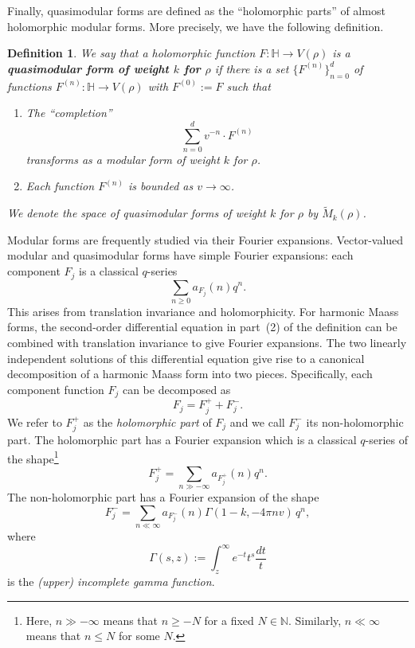 \documentclass[11pt,reqno]{amsart}
\newtheorem{definition}[theorem]{Definition}
\renewcommand{\=}{\;=\;}
\theoremstyle{myremark}
\begin{document}
Finally, quasimodular forms are defined as the ``holomorphic parts'' of almost holomorphic modular forms. 
More precisely, we have the following definition.
\begin{definition}
We say that a holomorphic function $F\colon\mathbb H\rightarrow V(\rho)$ is a {\bf quasimodular form of weight $k$ for $\rho$} if there is a set $\{F^{(n)}\}_{n=0}^d$ of functions $F^{(n)}\colon\mathbb H\rightarrow V(\rho)$ with $F^{(0)}:=F$ such that
\begin{enumerate}
\renewcommand{\labelenumi}{\textup{(\arabic{enumi})}}
    \item The ``completion'' 
        \[
        \sum_{n=0}^d v^{-n}\cdot F^{(n)}
        \]        
    transforms as a modular form of weight $k$ for $\rho$.
    \item  Each function $F^{(n)}$ is bounded as $v\rightarrow\infty$.
    \end{enumerate} 
We denote the space of quasimodular forms of weight $k$ for $\rho$ by $\widetilde M_k(\rho)$.
\end{definition}

Modular forms are frequently studied via their Fourier expansions. Vector-valued modular and quasimodular forms have simple Fourier expansions: each component $F_j$ is a classical $q$-series 
\[
\sum_{n\geq0}a_{F_j}(n)q^n.
\]
This arises from translation invariance and holomorphicity. 
For harmonic Maass forms, the second-order differential equation in part~(2) of the definition can be combined with translation invariance to give Fourier expansions.  
The two linearly independent solutions of this differential equation give rise to a canonical decomposition of a harmonic Maass form into two pieces.
Specifically, each component function $F_j$ can be decomposed as 
\[
F_j=F_j^+ + F_j^-.
\]
We refer to $F_j^+$ as the {\it holomorphic part} of $F_j$ and we call $F_j^-$ its non-holomorphic part. 
The holomorphic part has a Fourier expansion which is a classical $q$-series of the shape\footnote{Here, $n\gg-\infty$ means that $n\geq -N$ for a fixed $N\in\mathbb N$. 
Similarly, $n\ll\infty$ means that $n\leq N$ for some $N$.}
\[
F_j^+=\sum_{n\gg -\infty} a_{F_j^+}(n)q^n.
\]
The non-holomorphic part has a Fourier expansion of the shape
\[
F_j^-=\sum_{n\ll \infty} a_{F_j^-}(n)\Gamma(1-k,-4\pi n v)\,q^n,
\]
where
\[
\Gamma(s,z):=\int_z^{\infty} e^{-t}t^{s}\frac{dt}{t}
\]
is the {\it (upper) incomplete gamma function}.
\end{document}
